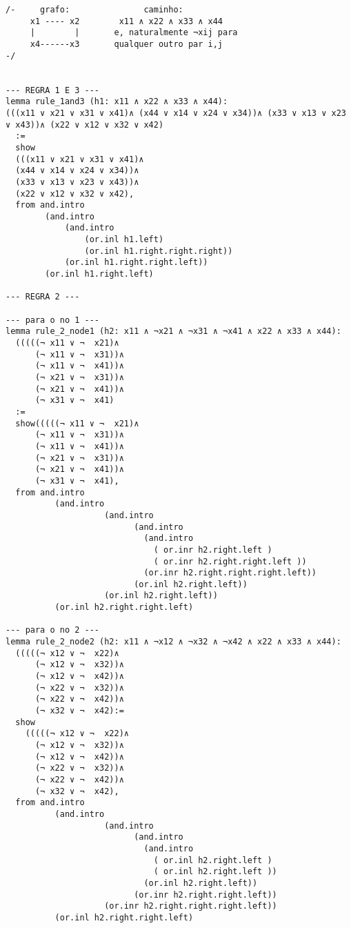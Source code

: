 \begin{enumerate}
\begin{lstlisting}
/-     grafo:               caminho:
     x1 ---- x2        x11 ∧ x22 ∧ x33 ∧ x44         
     |        |       e, naturalmente ¬xij para
     x4------x3       qualquer outro par i,j          
-/


--- REGRA 1 E 3 ---
lemma rule_1and3 (h1: x11 ∧ x22 ∧ x33 ∧ x44):
(((x11 ∨ x21 ∨ x31 ∨ x41)∧ (x44 ∨ x14 ∨ x24 ∨ x34))∧ (x33 ∨ x13 ∨ x23 ∨ x43))∧ (x22 ∨ x12 ∨ x32 ∨ x42)
  :=
  show 
  (((x11 ∨ x21 ∨ x31 ∨ x41)∧ 
  (x44 ∨ x14 ∨ x24 ∨ x34))∧
  (x33 ∨ x13 ∨ x23 ∨ x43))∧
  (x22 ∨ x12 ∨ x32 ∨ x42), 
  from and.intro 
        (and.intro 
            (and.intro 
                (or.inl h1.left)
                (or.inl h1.right.right.right))
            (or.inl h1.right.right.left))
        (or.inl h1.right.left)

--- REGRA 2 ---

--- para o no 1 ---
lemma rule_2_node1 (h2: x11 ∧ ¬x21 ∧ ¬x31 ∧ ¬x41 ∧ x22 ∧ x33 ∧ x44):
  (((((¬ x11 ∨ ¬  x21)∧
      (¬ x11 ∨ ¬  x31))∧ 
      (¬ x11 ∨ ¬  x41))∧ 
      (¬ x21 ∨ ¬  x31))∧ 
      (¬ x21 ∨ ¬  x41))∧ 
      (¬ x31 ∨ ¬  x41)
  :=
  show(((((¬ x11 ∨ ¬  x21)∧
      (¬ x11 ∨ ¬  x31))∧ 
      (¬ x11 ∨ ¬  x41))∧ 
      (¬ x21 ∨ ¬  x31))∧ 
      (¬ x21 ∨ ¬  x41))∧ 
      (¬ x31 ∨ ¬  x41),
  from and.intro
          (and.intro
                    (and.intro
                          (and.intro
                            (and.intro
                              ( or.inr h2.right.left ) 
                              ( or.inr h2.right.right.left ))
                            (or.inr h2.right.right.right.left))
                          (or.inl h2.right.left))
                    (or.inl h2.right.left))
          (or.inl h2.right.right.left)

--- para o no 2 ---
lemma rule_2_node2 (h2: x11 ∧ ¬x12 ∧ ¬x32 ∧ ¬x42 ∧ x22 ∧ x33 ∧ x44):
  (((((¬ x12 ∨ ¬  x22)∧
      (¬ x12 ∨ ¬  x32))∧ 
      (¬ x12 ∨ ¬  x42))∧ 
      (¬ x22 ∨ ¬  x32))∧ 
      (¬ x22 ∨ ¬  x42))∧ 
      (¬ x32 ∨ ¬  x42):=
  show
    (((((¬ x12 ∨ ¬  x22)∧
      (¬ x12 ∨ ¬  x32))∧ 
      (¬ x12 ∨ ¬  x42))∧ 
      (¬ x22 ∨ ¬  x32))∧ 
      (¬ x22 ∨ ¬  x42))∧ 
      (¬ x32 ∨ ¬  x42),
  from and.intro
          (and.intro
                    (and.intro
                          (and.intro
                            (and.intro
                              ( or.inl h2.right.left ) 
                              ( or.inl h2.right.left ))
                            (or.inl h2.right.left))
                          (or.inr h2.right.right.left))
                    (or.inr h2.right.right.right.left))
          (or.inl h2.right.right.left)


\end{lstlisting}
\end{enumerate}
